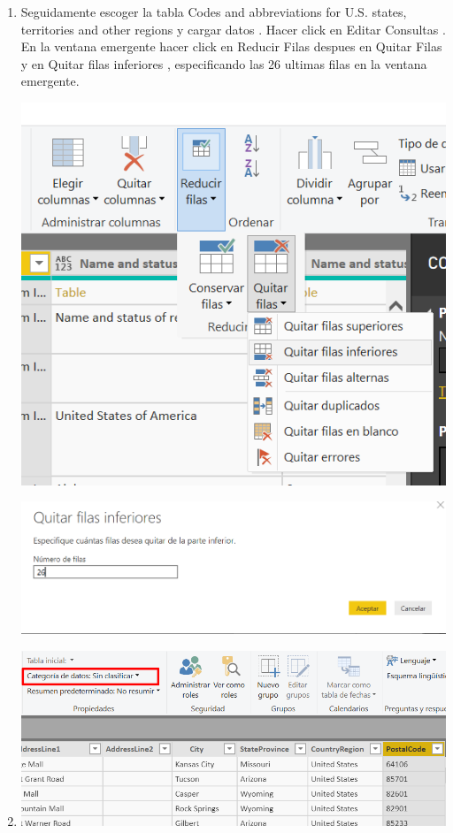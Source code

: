 \begin{itemize}
\begin{enumerate}
\item Seguidamente escoger la tabla Codes and abbreviations for U.S. states, territories and other regions y cargar datos . Hacer click en Editar Consultas . En la ventana emergente hacer click en Reducir Filas despues en Quitar Filas y en Quitar filas inferiores , especificando las 26 ultimas filas en la ventana emergente.

\begin{center}
\includegraphics[scale=0.55]{./Imagenes/tarea3_removerows.png}
\end{center}

\begin{center}
\includegraphics[scale=0.55]{./Imagenes/tarea3_26rows.png}
\end{center}


\item 

\begin{center}
\includegraphics[scale=0.55]{./Imagenes/24.png}
\end{center}


\end{enumerate}
\end{itemize}

